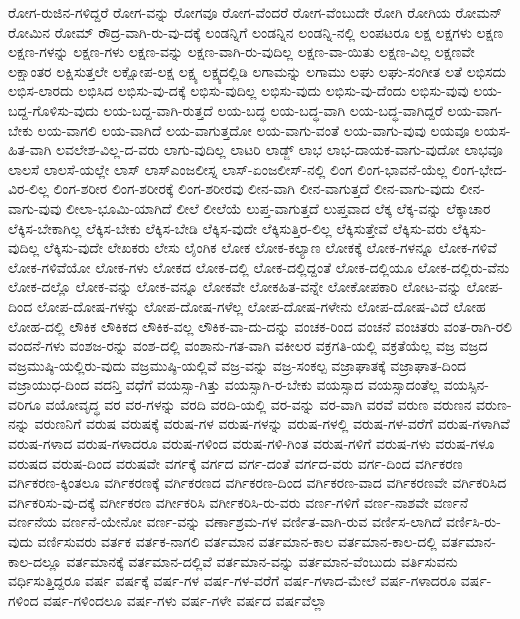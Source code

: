 {ರೋಗ-ರುಜಿನ-ಗಳಿದ್ದರೆ
ರೋಗ-ವನ್ನು
ರೋಗವೂ
ರೋಗ-ವೆಂದರೆ
ರೋಗ-ವೆಂಬುದೇ
ರೋಗಿ
ರೋಗಿಯ
ರೋಮನ್
ರೋಮಿನ
ರೋಮ್
ರೌದ್ರ-ವಾಗಿ-ರು-ವು-ದಕ್ಕೆ
ಲಂಡನ್ನಿಗೆ
ಲಂಡನ್ನಿನ
ಲಂಡನ್ನಿ-ನಲ್ಲಿ
ಲಂಪಟರೂ
ಲಕ್ಷ
ಲಕ್ಷಗಳು
ಲಕ್ಷಣ
ಲಕ್ಷಣ-ಗಳನ್ನು
ಲಕ್ಷಣ-ಗಳು
ಲಕ್ಷಣ-ವನ್ನು
ಲಕ್ಷಣ-ವಾಗಿ-ರು-ವುದಿಲ್ಲ
ಲಕ್ಷಣ-ವಾ-ಯಿತು
ಲಕ್ಷಣ-ವಿಲ್ಲ
ಲಕ್ಷಣವೇ
ಲಕ್ಷಾಂತರ
ಲಕ್ಷಿಸುತ್ತಲೇ
ಲಕ್ಷೋಪ-ಲಕ್ಷ
ಲಕ್ಷ್ಯ
ಲಕ್ಷ್ಯದಲ್ಲಿಡಿ
ಲಗಾಮನ್ನು
ಲಗಾಮು
ಲಘು
ಲಘು-ಸಂಗೀತ
ಲತೆ
ಲಭಿಸದು
ಲಭಿಸ-ಲಾರದು
ಲಭಿಸಿದ
ಲಭಿಸು-ವು-ದಕ್ಕೆ
ಲಭಿಸು-ವುದಿಲ್ಲ
ಲಭಿಸು-ವುದು
ಲಭಿಸು-ವು-ದೆಂದು
ಲಭಿಸು-ವುವು
ಲಯ-ಬದ್ದ-ಗೊಳಿಸು-ವುದು
ಲಯ-ಬದ್ದ-ವಾಗಿ-ರುತ್ತದೆ
ಲಯ-ಬದ್ಧ
ಲಯ-ಬದ್ಧ-ವಾಗಿ
ಲಯ-ಬದ್ಧ-ವಾಗಿದ್ದರೆ
ಲಯ-ವಾಗ-ಬೇಕು
ಲಯ-ವಾಗಲಿ
ಲಯ-ವಾಗಿದೆ
ಲಯ-ವಾಗುತ್ತದೋ
ಲಯ-ವಾಗು-ವಂತೆ
ಲಯ-ವಾಗು-ವುವು
ಲಯವೂ
ಲಯಸ-ಹಿತ-ವಾಗಿ
ಲವಲೇಶ-ವಿಲ್ಲ-ದ-ವರು
ಲಾಗು-ವುದಿಲ್ಲ
ಲಾಟರಿ
ಲಾಡ್ಜ್
ಲಾಭ
ಲಾಭ-ದಾಯಕ-ವಾಗು-ವುದೋ
ಲಾಭವೂ
ಲಾಲಸೆ
ಲಾಲಸೆ-ಯಲ್ಲೇ
ಲಾಸ್
ಲಾಸ್ಎಂಜಲೀಸ್ನ
ಲಾಸ್-ಏಂಜಲೀಸ್-ನಲ್ಲಿ
ಲಿಂಗ
ಲಿಂಗ-ಭಾವನೆ-ಯೆಲ್ಲ
ಲಿಂಗ-ಭೇದ-ವಿರ-ಲಿಲ್ಲ
ಲಿಂಗ-ಶರೀರ
ಲಿಂಗ-ಶರೀರಕ್ಕೆ
ಲಿಂಗ-ಶರೀರವು
ಲೀನ-ವಾಗಿ
ಲೀನ-ವಾಗುತ್ತದೆ
ಲೀನ-ವಾಗು-ವುದು
ಲೀನ-ವಾಗು-ವುವು
ಲೀಲಾ-ಭೂಮಿ-ಯಾಗಿದೆ
ಲೀಲೆ
ಲೀಲೆಯೆ
ಲುಪ್ತ-ವಾಗುತ್ತದೆ
ಲುಪ್ತವಾದ
ಲೆಕ್ಕ
ಲೆಕ್ಕ-ವನ್ನು
ಲೆಕ್ಕಾಚಾರ
ಲೆಕ್ಕಿಸ-ಬೇಕಾಗಿಲ್ಲ
ಲೆಕ್ಕಿಸ-ಬೇಕು
ಲೆಕ್ಕಿಸ-ಬೇಡಿ
ಲೆಕ್ಕಿಸ-ವುದೇ
ಲೆಕ್ಕಿಸುತ್ತಿರ-ಲಿಲ್ಲ
ಲೆಕ್ಕಿಸುತ್ತೇವೆ
ಲೆಕ್ಕಿಸು-ವರು
ಲೆಕ್ಕಿಸು-ವುದಿಲ್ಲ
ಲೆಕ್ಕಿಸು-ವುದೇ
ಲೇಖಕರು
ಲೇಸು
ಲೈಂಗಿಕ
ಲೋಕ
ಲೋಕ-ಕಲ್ಯಾಣ
ಲೋಕಕ್ಕೆ
ಲೋಕ-ಗಳನ್ನೂ
ಲೋಕ-ಗಳಿವೆ
ಲೋಕ-ಗಳಿವೆಯೋ
ಲೋಕ-ಗಳು
ಲೋಕದ
ಲೋಕ-ದಲ್ಲಿ
ಲೋಕ-ದಲ್ಲಿದ್ದಂತೆ
ಲೋಕ-ದಲ್ಲಿಯೂ
ಲೋಕ-ದಲ್ಲಿರು-ವೆನು
ಲೋಕ-ದಲ್ಲೊ
ಲೋಕ-ವನ್ನು
ಲೋಕ-ವನ್ನೂ
ಲೋಕವೇ
ಲೋಕಹಿತ-ವನ್ನೇ
ಲೋಕೋಪಕಾರಿ
ಲೋಟ-ವನ್ನು
ಲೋಪ-ದಿಂದ
ಲೋಪ-ದೋಷ-ಗಳನ್ನು
ಲೋಪ-ದೋಷ-ಗಳೆಲ್ಲ
ಲೋಪ-ದೋಷ-ಗಳೇನು
ಲೋಪ-ದೋಷ-ವಿದೆ
ಲೋಹ
ಲೋಹ-ದಲ್ಲಿ
ಲೌಕಿಕ
ಲೌಕಿಕದ
ಲೌಕಿಕ-ವಲ್ಲ
ಲೌಕಿಕ-ವಾ-ದು-ದನ್ನು
ವಂಚಕ-ರಿಂದ
ವಂಚನೆ
ವಂಚಿತರು
ವಂತ-ರಾಗಿ-ರಲಿ
ವಂದನೆ-ಗಳು
ವಂಶಜ-ರನ್ನು
ವಂಶ-ದಲ್ಲಿ
ವಂಶಾನು-ಗತ-ವಾಗಿ
ವಕೀಲರ
ವಕ್ರಗತಿ-ಯಲ್ಲಿ
ವಕ್ರತೆಯೆಲ್ಲ
ವಜ್ರ
ವಜ್ರದ
ವಜ್ರಮುಷ್ಠಿ-ಯಲ್ಲಿರು-ವುದು
ವಜ್ರಮುಷ್ಠಿ-ಯಲ್ಲಿವೆ
ವಜ್ರ-ವನ್ನು
ವಜ್ರ-ಸಂಕಲ್ಪ
ವಜ್ರಾಘಾತಕ್ಕೆ
ವಜ್ರಾಘಾತ-ದಿಂದ
ವಜ್ರಾಯುಧ-ದಿಂದ
ವದನ್ತಿ
ವಧೆಗೆ
ವಯಸ್ಸಾ-ಗಿತ್ತು
ವಯಸ್ಸಾಗಿ-ರ-ಬೇಕು
ವಯಸ್ಸಾದ
ವಯಸ್ಸಾದಂತೆಲ್ಲ
ವಯಸ್ಸಿನ-ವರಿಗೂ
ವಯೋವೃದ್ಧ
ವರ
ವರ-ಗಳನ್ನು
ವರದಿ
ವರದಿ-ಯಲ್ಲಿ
ವರ-ವನ್ನು
ವರ-ವಾಗಿ
ವರವೆ
ವರುಣ
ವರುಣನ
ವರುಣ-ನನ್ನು
ವರುಣನಿಗೆ
ವರುಷ
ವರುಷಕ್ಕೆ
ವರುಷ-ಗಳ
ವರುಷ-ಗಳನ್ನು
ವರುಷ-ಗಳಲ್ಲಿ
ವರುಷ-ಗಳ-ವರೆಗೆ
ವರುಷ-ಗಳಾಗಿವೆ
ವರುಷ-ಗಳಾದ
ವರುಷ-ಗಳಾದರೂ
ವರುಷ-ಗಳಿಂದ
ವರುಷ-ಗಳಿ-ಗಿಂತ
ವರುಷ-ಗಳಿಗೆ
ವರುಷ-ಗಳು
ವರುಷ-ಗಳೂ
ವರುಷದ
ವರುಷ-ದಿಂದ
ವರುಷವೇ
ವರ್ಗಕ್ಕೆ
ವರ್ಗದ
ವರ್ಗ-ದಂತೆ
ವರ್ಗದ-ವರು
ವರ್ಗ-ದಿಂದ
ವರ್ಗಿಕರಣ
ವರ್ಗಿಕರಣ-ಕ್ಕಿಂತಲೂ
ವರ್ಗಿಕರಣಕ್ಕೆ
ವರ್ಗಿಕರಣದ
ವರ್ಗಿಕರಣ-ದಿಂದ
ವರ್ಗಿಕರಣ-ವಾದ
ವರ್ಗಿಕರಣವೇ
ವರ್ಗಿಕರಿಸಿದ
ವರ್ಗಿಕರಿಸು-ವು-ದಕ್ಕೆ
ವರ್ಗೀಕರಣ
ವರ್ಗೀಕರಿಸಿ
ವರ್ಗೀಕರಿಸಿ-ರು-ವರು
ವರ್ಣ-ಗಳಿಗೆ
ವರ್ಣ-ನಾಶವೇ
ವರ್ಣನೆ
ವರ್ಣನೆಯ
ವರ್ಣನೆ-ಯೇನೋ
ವರ್ಣ-ವನ್ನು
ವರ್ಣಾಶ್ರಮ-ಗಳ
ವರ್ಣಿತ-ವಾಗಿ-ರುವ
ವರ್ಣಿಸ-ಲಾಗಿದೆ
ವರ್ಣಿಸಿ-ರು-ವುದು
ವರ್ಣಿಸುವರು
ವರ್ತಕ
ವರ್ತಕ-ನಾಗಲಿ
ವರ್ತಮಾನ
ವರ್ತಮಾನ-ಕಾಲ
ವರ್ತಮಾನ-ಕಾಲ-ದಲ್ಲಿ
ವರ್ತಮಾನ-ಕಾಲ-ದಲ್ಲೂ
ವರ್ತಮಾನಕ್ಕೆ
ವರ್ತಮಾನ-ದಲ್ಲಿವೆ
ವರ್ತಮಾನ-ವನ್ನು
ವರ್ತಮಾನ-ವೆಂಬುದು
ವರ್ತಿಸುವನು
ವರ್ಧಿಸುತ್ತಿದ್ದರೂ
ವರ್ಷ
ವರ್ಷಕ್ಕೆ
ವರ್ಷ-ಗಳ
ವರ್ಷ-ಗಳ-ವರೆಗೆ
ವರ್ಷ-ಗಳಾದ-ಮೇಲೆ
ವರ್ಷ-ಗಳಾದರೂ
ವರ್ಷ-ಗಳಿಂದ
ವರ್ಷ-ಗಳಿಂದಲೂ
ವರ್ಷ-ಗಳು
ವರ್ಷ-ಗಳೇ
ವರ್ಷದ
ವರ್ಷವೆಲ್ಲಾ
}

